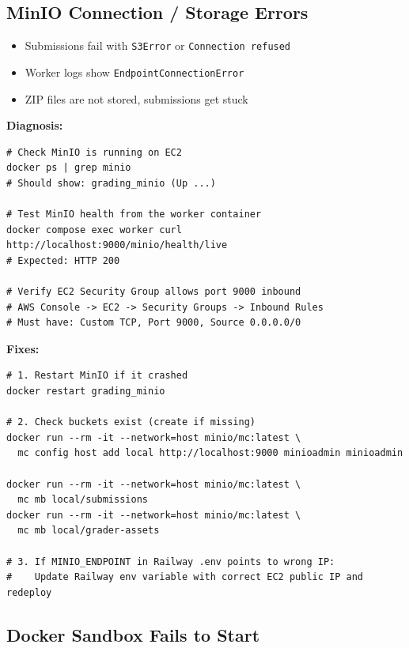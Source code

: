 \documentclass[12pt,a4paper]{article}
\begin{document}
\subsection{MinIO Connection / Storage Errors}

\begin{troublebox}[Symptoms]
\begin{itemize}
  \item Submissions fail with \texttt{S3Error} or \texttt{Connection refused}
  \item Worker logs show \texttt{EndpointConnectionError}
  \item ZIP files are not stored, submissions get stuck
\end{itemize}
\end{troublebox}

\textbf{Diagnosis:}

\begin{lstlisting}[style=terminal]
# Check MinIO is running on EC2
docker ps | grep minio
# Should show: grading_minio (Up ...)

# Test MinIO health from the worker container
docker compose exec worker curl http://localhost:9000/minio/health/live
# Expected: HTTP 200

# Verify EC2 Security Group allows port 9000 inbound
# AWS Console -> EC2 -> Security Groups -> Inbound Rules
# Must have: Custom TCP, Port 9000, Source 0.0.0.0/0
\end{lstlisting}

\textbf{Fixes:}

\begin{lstlisting}[style=terminal]
# 1. Restart MinIO if it crashed
docker restart grading_minio

# 2. Check buckets exist (create if missing)
docker run --rm -it --network=host minio/mc:latest \
  mc config host add local http://localhost:9000 minioadmin minioadmin

docker run --rm -it --network=host minio/mc:latest \
  mc mb local/submissions
docker run --rm -it --network=host minio/mc:latest \
  mc mb local/grader-assets

# 3. If MINIO_ENDPOINT in Railway .env points to wrong IP:
#    Update Railway env variable with correct EC2 public IP and redeploy
\end{lstlisting}

\subsection{Docker Sandbox Fails to Start}
\end{document}
